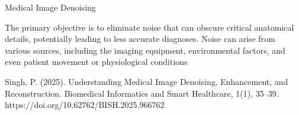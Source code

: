 Medical Image Denoising


The primary objective is to eliminate noise that can obscure critical anatomical details, potentially leading to less accurate diagnoses. Noise can arise from various sources, including the imaging equipment, environmental factors, and even patient movement or physiological conditions

Singh, P. (2025). Understanding Medical Image Denoising, Enhancement, and Reconstruction. Biomedical Informatics and Smart Healthcare, 1(1), 35–39. https://doi.org/10.62762/BISH.2025.966762

